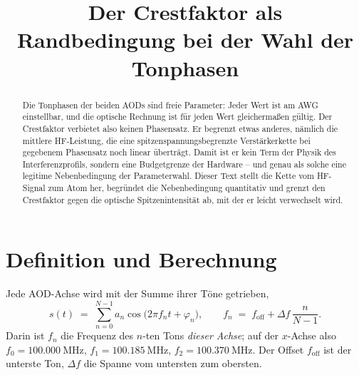 \documentclass[11pt,a4paper]{article}
\title{Der Crestfaktor als Randbedingung bei der Wahl der Tonphasen}
\author{}
\date{}
\begin{document}
\maketitle

\begin{abstract}
\noindent
Die Tonphasen der beiden AODs sind freie Parameter: Jeder Wert ist am AWG
einstellbar, und die optische Rechnung ist für jeden Wert gleichermaßen
gültig. Der Crestfaktor verbietet also keinen Phasensatz. Er begrenzt
etwas anderes, nämlich die mittlere HF-Leistung, die eine
spitzenspannungsbegrenzte Verstärkerkette bei gegebenem Phasensatz noch
linear überträgt. Damit ist er kein Term der Physik des Interferenzprofils,
sondern eine Budgetgrenze der Hardware -- und genau als solche eine
legitime Nebenbedingung der Parameterwahl. Dieser Text stellt die Kette vom
HF-Signal zum Atom her, begründet die Nebenbedingung quantitativ und grenzt
den Crestfaktor gegen die optische Spitzenintensität ab, mit der er leicht
verwechselt wird.
\end{abstract}

\section{Definition und Berechnung}

Jede AOD-Achse wird mit der Summe ihrer Töne getrieben,
\begin{equation}
  s(t) \;=\; \sum_{n=0}^{N-1} a_n \cos\!\bigl(2\pi f_n t + \varphi_n\bigr),
  \qquad
  f_n \;=\; f_\mathrm{off} + \Delta f\, \frac{n}{N-1}.
  \label{eq:rf}
\end{equation}
Darin ist $f_n$ die Frequenz des $n$-ten Tons \emph{dieser Achse}; auf der
$x$-Achse also $f_0 = \SI{100.000}{\mega\hertz}$,
$f_1 = \SI{100.185}{\mega\hertz}$, $f_2 = \SI{100.370}{\mega\hertz}$. Der
Offset $f_\mathrm{off}$ ist der unterste Ton, $\Delta f$ die Spanne vom
untersten zum obersten.
\end{document}
